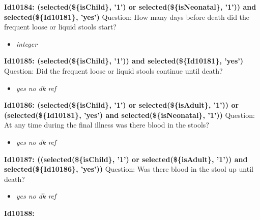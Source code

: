 \documentclass{article}%
\begin{document}
\textbf{Id10184: (selected(\$\{isChild\}, '1') or selected(\$\{isNeonatal\}, '1')) and selected(\$\{Id10181\}, 'yes')\newline%
}%
Question: How many days before death did the frequent loose or liquid stools start?\newline%
%
\begin{itemize}%
\item%
\textit{integer\newline%
}%
\end{itemize}%
\textbf{Id10185: (selected(\$\{isChild\}, '1')) and selected(\$\{Id10181\}, 'yes')\newline%
}%
Question: Did the frequent loose or liquid stools continue until death?\newline%
%
\begin{itemize}%
\item%
\textit{yes\newline%
 no\newline%
 dk\newline%
 ref\newline%
}%
\end{itemize}%
\textbf{Id10186: (selected(\$\{isChild\}, '1') or selected(\$\{isAdult\}, '1')) or (selected(\$\{Id10181\}, 'yes') and selected(\$\{isNeonatal\}, '1'))\newline%
}%
Question: At any time during the final illness was there blood in the stools?\newline%
%
\begin{itemize}%
\item%
\textit{yes\newline%
 no\newline%
 dk\newline%
 ref\newline%
}%
\end{itemize}%
\textbf{Id10187: ((selected(\$\{isChild\}, '1') or selected(\$\{isAdult\}, '1')) and selected(\$\{Id10186\}, 'yes'))\newline%
}%
Question: Was there blood in the stool up until death?\newline%
%
\begin{itemize}%
\item%
\textit{yes\newline%
 no\newline%
 dk\newline%
 ref\newline%
}%
\end{itemize}%
\textbf{Id10188: \newline%
}%
\end{document}
